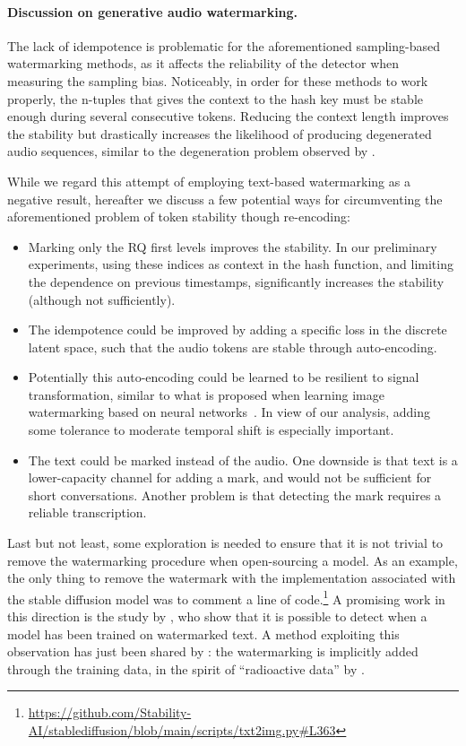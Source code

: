 \paragraph{Discussion on generative audio watermarking.} The lack of idempotence is problematic for 
the aforementioned sampling-based watermarking methods, as it affects the reliability of the detector when measuring the sampling bias. Noticeably, in order for these methods to work properly, the n-tuples that gives the context to the hash key must be stable enough during several consecutive tokens. Reducing the context length improves the stability but drastically increases the likelihood of producing degenerated audio sequences, similar to the degeneration problem observed by \citep{holtzman2019curious}. 

While we regard this attempt of employing text-based watermarking as a negative result, hereafter we discuss a few potential ways for  circumventing the aforementioned problem of token stability though re-encoding:
\begin{itemize}
    \item Marking only the RQ first levels improves the stability. In our preliminary experiments, using these indices as context in the hash function, and limiting the dependence on previous timestamps, significantly increases the stability (although not sufficiently). \\[-1.8em]
    \item The idempotence could be improved by adding a specific loss in the discrete latent space, such that the audio tokens are stable through auto-encoding. \\[-1.8em]
    \item Potentially this auto-encoding could be learned to be resilient to signal transformation, similar to what is proposed when learning  image watermarking based on neural networks~\citep{zhu2018hidden,fernandez2022watermarking}. In view of our analysis, adding some tolerance to moderate temporal shift is especially important. \\[-1.8em]
    \item The text could be marked instead of the audio. One downside is that text is a lower-capacity channel for adding a mark, and would not be sufficient for short conversations. Another problem is that detecting the mark requires a reliable transcription. 
\end{itemize}
Last but not least, some exploration is needed to ensure that it is not trivial to remove the watermarking procedure when open-sourcing a model. As an example, the only thing to remove the watermark with the implementation associated with the stable diffusion model was to comment a line of code.\footnote{\url{https://github.com/Stability-AI/stablediffusion/blob/main/scripts/txt2img.py\#L363}} 
A promising work in this direction is the study by \cite{sander2024watermarking}, who show that it is possible to detect when a model has been trained on watermarked text. 
A method exploiting this observation has just been shared by \cite{san2024latent}: the watermarking is implicitly added through the training data, in the spirit of ``radioactive data'' by \cite{sablayrolles2020radioactive}. 
